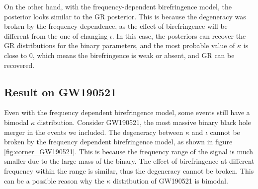 \documentclass[aps,prd,twocolumn,superscriptaddress,preprintnumbers,floatfix,nofootinbib]{revtex4-2}
\begin{document}
On the other hand, with the frequency-dependent birefringence model, the posterior looks similar to the GR posterior.
This is because the degeneracy was broken by the frequency dependence, as the effect of birefringence will be different from the one of changing $\iota$.
In this case, the posteriors can recover the GR distributions for the binary parameters, and the most probable value of $\kappa$ is close to $0$, which means the birefringence is weak or absent, and GR can be recovered.


\subsection{Result on GW190521}
Even with the frequency dependent birefringence model, some events still have a bimodal $\kappa$ distribution.
Consider GW190521, the most massive binary black hole merger in the events we included.
The degeneracy between $\kappa$ and $\iota$ cannot be broken by the frequency dependent birefringence model, as shown in figure \ref{fig:corner_GW190521}.
This is because the frequency range of the signal is much smaller due to the large mass of the binary.
The effect of birefringence at different frequency within the range is similar, thus the degeneracy cannot be broken.
This can be a possible reason why the $\kappa$ distribution of GW190521 is bimodal.

\end{document}
